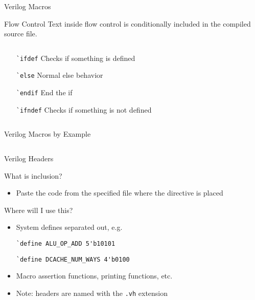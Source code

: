 \documentclass[dvipsnames]{beamer}
\begin{document}
\begin{frame}{Verilog Macros}
	\begin{block}{Flow Control}
		Text inside flow control is conditionally included in the
		compiled source file.
	\end{block}
	\begin{columns}
		\begin{column}[T]{0.9\textwidth}
			\begin{itemize}
				\item[\texttt{\`{}ifdef}] Checks if something is defined
				\item[\texttt{\`{}else}] Normal else behavior
				\item[\texttt{\`{}endif}] End the if
				\item[\texttt{\`{}ifndef}] Checks if something is not
					defined
			\end{itemize}
		\end{column}
	\end{columns}	
\end{frame}

\begin{frame}{Verilog Macros by Example}
	\vspace*{-12pt}
	\inputminted[frame=lines,fontsize=\scriptsize,tabsize=4,obeytabs=true]{verilog}{verilog/macro.v}
\end{frame}

\begin{frame}[fragile]{Verilog Headers}
	\begin{block}{What is inclusion?}
		\begin{itemize}
			\item Paste the code from the specified file where the directive is
				placed
		\end{itemize}
	\end{block}
	\begin{block}{Where will I use this?}
		\begin{itemize}
			\item System defines separated out, e.g.
				\begin{verbatim}
`define ALU_OP_ADD 5'b10101
				\end{verbatim}
				\begin{verbatim}
`define DCACHE_NUM_WAYS 4'b0100
				\end{verbatim}
			\item Macro assertion functions, printing functions, etc.
			\item Note: headers are named with the \texttt{.vh} extension
		\end{itemize}
	\end{block}
\end{frame}
\end{document}
